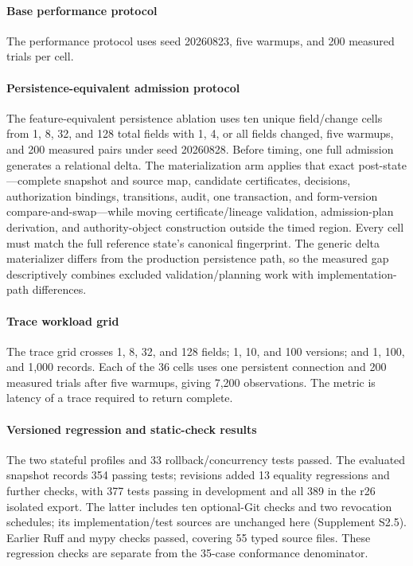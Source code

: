 \paragraph{Base performance protocol}
The performance protocol uses seed 20260823, five warmups, and 200 measured trials per cell.

\paragraph{Persistence-equivalent admission protocol}
The feature-equivalent persistence ablation uses ten unique field/change cells from 1, 8, 32, and 128 total fields with 1, 4, or all fields changed, five warmups, and 200 measured pairs under seed 20260828. Before timing, one full admission generates a relational delta. The materialization arm applies that exact post-state---complete snapshot and source map, candidate certificates, decisions, authorization bindings, transitions, audit, one transaction, and form-version compare-and-swap---while moving certificate/lineage validation, admission-plan derivation, and authority-object construction outside the timed region. Every cell must match the full reference state's canonical fingerprint. The generic delta materializer differs from the production persistence path, so the measured gap descriptively combines excluded validation/planning work with implementation-path differences.

\paragraph{Trace workload grid}
The trace grid crosses 1, 8, 32, and 128 fields; 1, 10, and 100 versions; and 1, 100, and 1,000 records. Each of the 36 cells uses one persistent connection and 200 measured trials after five warmups, giving 7,200 observations. The metric is latency of a trace required to return complete.

\paragraph{Versioned regression and static-check results}
The two stateful profiles and 33 rollback/concurrency tests passed. The evaluated snapshot records 354 passing tests; revisions added 13 equality regressions and further checks, with 377 tests passing in development and all 389 in the r26 isolated export. The latter includes ten optional-Git checks and two revocation schedules; its implementation/test sources are unchanged here (Supplement S2.5). Earlier Ruff and mypy checks passed, covering 55 typed source files. These regression checks are separate from the 35-case conformance denominator.
